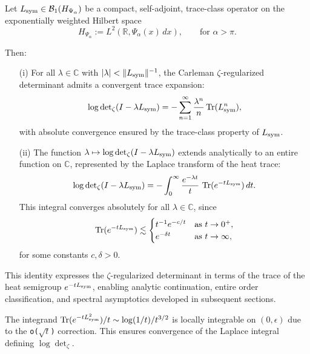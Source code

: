 \begin{lemma}
\label{lem:det_via_heat_trace}
Let \( L_{\mathrm{sym}} \in \mathcal{B}_1(H_{\Psi_\alpha}) \) be a compact, self-adjoint, trace-class operator on the exponentially weighted Hilbert space
\[
H_{\Psi_\alpha} := L^2(\mathbb{R}, \Psi_\alpha(x)\, dx), \qquad \text{for } \alpha > \pi.
\]

Then:
\begin{enumerate}
  \item[\textnormal{(i)}] For all \( \lambda \in \mathbb{C} \) with \( |\lambda| < \| L_{\mathrm{sym}} \|^{-1} \), the Carleman \(\zeta\)-regularized determinant admits a convergent trace expansion:
  \[
  \log \det\nolimits_{\zeta}(I - \lambda L_{\mathrm{sym}})
  = - \sum_{n=1}^\infty \frac{\lambda^n}{n} \operatorname{Tr}(L_{\mathrm{sym}}^n),
  \]
  with absolute convergence ensured by the trace-class property of \( L_{\mathrm{sym}} \).

  \item[\textnormal{(ii)}] The function \( \lambda \mapsto \log \det\nolimits_{\zeta}(I - \lambda L_{\mathrm{sym}}) \) extends analytically to an entire function on \( \mathbb{C} \), represented by the Laplace transform of the heat trace:
  \[
  \log \det\nolimits_{\zeta}(I - \lambda L_{\mathrm{sym}})
  = - \int_0^\infty \frac{e^{-\lambda t}}{t} \, \operatorname{Tr}(e^{-t L_{\mathrm{sym}}}) \, dt.
  \]
  This integral converges absolutely for all \( \lambda \in \mathbb{C} \), since
  \[
  \operatorname{Tr}(e^{-t L_{\mathrm{sym}}}) \lesssim
  \begin{cases}
    t^{-1} e^{-c/t} & \text{as } t \to 0^+, \\
    e^{-\delta t}   & \text{as } t \to \infty,
  \end{cases}
  \]
  for some constants \( c, \delta > 0 \).
\end{enumerate}

\medskip
\noindent
This identity expresses the \(\zeta\)-regularized determinant in terms of the trace of the heat semigroup \( e^{-t L_{\mathrm{sym}}} \), enabling analytic continuation, entire order classification, and spectral asymptotics developed in subsequent sections.
\end{lemma}

\begin{remark}
The integrand \( \operatorname{Tr}(e^{-tL_{\mathrm{sym}}^2}) / t \sim \log(1/t)/t^{3/2} \) is locally integrable on \( (0,\epsilon) \) due to the \texttt{o(\( \sqrt{t} \))} correction. This ensures convergence of the Laplace integral defining \( \log \det_\zeta \).
\end{remark}
